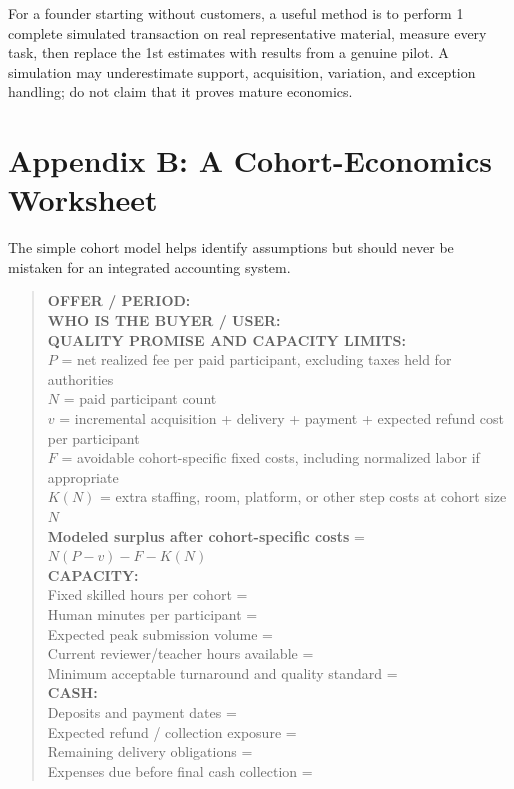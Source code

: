 For a founder starting without customers, a useful method is to perform 1 complete simulated transaction on real representative material, measure every task, then replace the 1st estimates with results from a genuine pilot. A simulation may underestimate support, acquisition, variation, and exception handling; do not claim that it proves mature economics.

\section*{Appendix B: A Cohort-Economics Worksheet}

The simple cohort model helps identify assumptions but should never be mistaken for an integrated accounting system.

\begin{quote}
\small
\textbf{OFFER / PERIOD:}\\
\textbf{WHO IS THE BUYER / USER:}\\
\textbf{QUALITY PROMISE AND CAPACITY LIMITS:}\\[1ex]
$P$ = net realized fee per paid participant, excluding taxes held for authorities\\
$N$ = paid participant count\\
$v$ = incremental acquisition + delivery + payment + expected refund cost per participant\\
$F$ = avoidable cohort-specific fixed costs, including normalized labor if appropriate\\
$K(N)$ = extra staffing, room, platform, or other step costs at cohort size $N$\\[1ex]
\textbf{Modeled surplus after cohort-specific costs} = $N(P-v) - F - K(N)$\\[1ex]
\textbf{CAPACITY:}\\
Fixed skilled hours per cohort =\\
Human minutes per participant =\\
Expected peak submission volume =\\
Current reviewer/teacher hours available =\\
Minimum acceptable turnaround and quality standard =\\[1ex]
\textbf{CASH:}\\
Deposits and payment dates =\\
Expected refund / collection exposure =\\
Remaining delivery obligations =\\
Expenses due before final cash collection =\\[1ex]

\end{quote}
